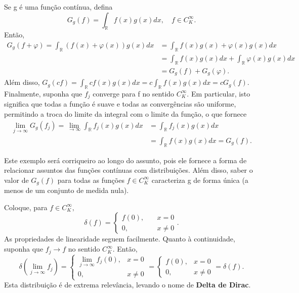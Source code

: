 \documentclass[measure_theory.tex]{subfiles}
\begin{document}
\begin{example}
	Se g é uma função contínua, defina
	\[
		G_{g}(f) = \int_{\mathbb{R}}^{}f(x)g(x)dx,\quad f\in C_{K}^{\infty}.
	\]
	Então,
	\begin{align*}
		G_{g}(f + \varphi ) = \int_{\mathbb{R}}^{}(f(x)+\varphi (x))g(x)dx & = \int_{\mathbb{R}}^{}f(x)g(x) + \varphi (x)g(x)dx                       \\
		                                                                   & = \int_{\mathbb{R}}^{}f(x)g(x)dx + \int_{\mathbb{R}}^{}\varphi (x)g(x)dx \\
		                                                                   & = G_{g}(f) + G_{g}(\varphi ).
	\end{align*}
	Além disso, \(G_{g}(cf) = \int_{\mathbb{R}}^{}cf(x)g(x)dx = c \int_{\mathbb{R}}^{}f(x)g(x)dx = cG_{g}(f).\) Finalmente, suponha que \(f_{j}\) converge para f no sentido \(C_{K}^{\infty}.\) Em particular, isto significa que todas a função é suave e todas
	as convergências são uniforme, permitindo a troca do limite da integral com o limite da função, o que fornece
	\begin{align*}
		\lim_{j\to \infty}G_{g}(f_{j}) = \lim_{\to \infty} \int_{\mathbb{R}}^{}f_{j}(x)g(x)dx & = \int_{\mathbb{R}}^{}f_{j}(x)g(x)dx         \\
		                                                                                      & = \int_{\mathbb{R}}^{}f(x)g(x)dx = G_{g}(f).
	\end{align*}
\end{example}
Este exemplo será corriqueiro ao longo do assunto, pois ele fornece a forma de relacionar assuntos das funções contínuas com distribuições. Além disso, saber o valor de \(G_{g}(f)\) para todas as funções \(f\in C_{K}^{\infty}\) caracteriza g
de forma única (a menos de um conjunto de medida nula).
\begin{example}
	Coloque, para \(f\in C_{K}^{\infty},\)
	\[
		\delta (f) = \left\{\begin{array}{ll}
			f(0), & \quad x=0     \\
			0,    & \quad x\neq 0
		\end{array}\right..
	\]
	As propriedades de linearidade seguem facilmente. Quanto à continuidade, suponha que \(f_{j}\to f\) no sentido \(C_{K}^{\infty}.\) Então,
	\[
		\delta (\lim_{j\to \infty}f_{j})  = \left\{\begin{array}{ll}
			\lim_{j\to \infty}f_{j}(0), & x = 0   \\
			0,                          & x\neq 0
		\end{array}\right.  = \left\{\begin{array}{ll}
			f(0), & x = 0   \\
			0,    & x\neq 0
		\end{array}\right. = \delta (f).
	\]
	Esta distribuição é de extrema relevância, levando o nome de \textbf{Delta de Dirac}.
\end{example}
\end{document}

